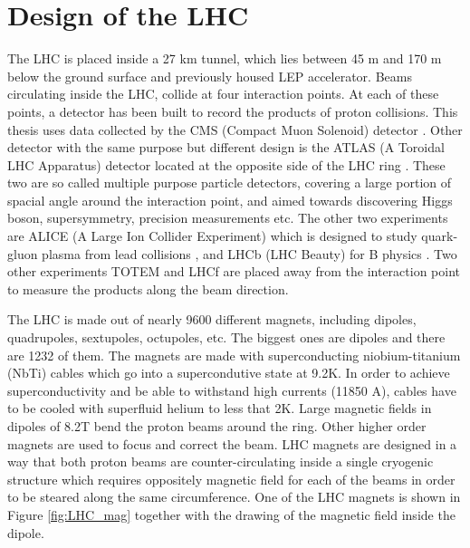 \section{Design of the LHC}

The LHC is placed inside a 27 km tunnel, which lies between 45 m and 170 m below the ground surface and previously housed LEP accelerator. Beams circulating inside the LHC, collide at four interaction points. At each of these points, a detector has been built to record the products of proton collisions. This thesis uses data collected by the CMS (Compact Muon Solenoid) detector \cite{Chatrchyan:2008aa}. Other detector with the same purpose but different design is the ATLAS (A Toroidal LHC Apparatus) detector located at the opposite side of the LHC ring \cite{Aad:2008zzm} . These two are so called multiple purpose particle detectors, covering a large portion of spacial angle around the interaction point, and aimed towards discovering Higgs boson, supersymmetry, precision measurements etc. The other two experiments are ALICE (A Large Ion Collider Experiment) which is designed to study quark-gluon plasma from lead collisions \cite{Aamodt:2008zz}, and LHCb (LHC Beauty) for B physics \cite{Alves:2008zz}. Two other experiments TOTEM and LHCf are placed away from the interaction point to measure the products along the beam direction.
\par The LHC is made out of nearly 9600 different magnets, including dipoles, quadrupoles, sextupoles, octupoles, etc. The biggest ones are dipoles and there are 1232 of them. The magnets are made with superconducting niobium-titanium (NbTi) cables which go into a supercondutive state at 9.2K. 
In order to achieve superconductivity and be able to withstand high currents (11850 A), cables have to be cooled with superfluid helium to less that 2K. 
Large magnetic fields in dipoles of 8.2T bend the proton beams around the ring. Other higher order magnets are used to focus and correct the beam. 
LHC magnets are designed in a way that both proton beams are counter-circulating inside a single cryogenic structure which requires oppositely  magnetic field for each of the beams in order to be steared along the same circumference. One of the LHC magnets is shown in Figure \ref{fig:LHC_mag} together with the drawing of the magnetic field inside the dipole. 
    
